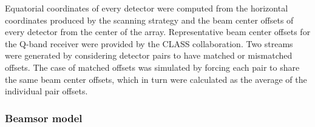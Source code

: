 \documentclass[a4paper,11pt]{article}
\begin{document}

Equatorial coordinates of every detector were computed from the horizontal coordinates produced by the scanning strategy and the beam center offsets of every detector from the center of the array.
Representative beam center offsets for the Q-band receiver were provided by the CLASS collaboration. Two streams were generated by considering detector pairs to have matched or mismatched offsets. The case of matched offsets was simulated by forcing each pair to share the same beam center offsets, which in turn were calculated as the average of the individual pair offsets. %

\subsubsection{Beamsor model}

\end{document}
